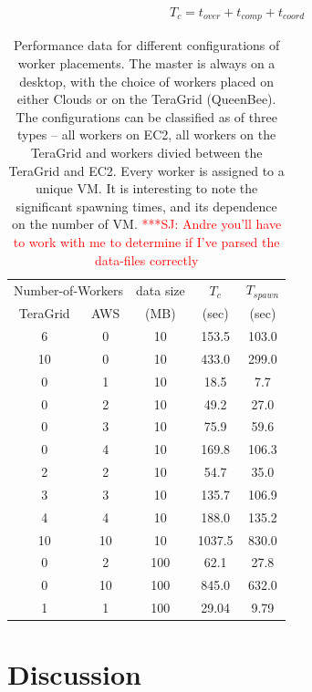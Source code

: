 \documentclass[conference,final]{IEEEtran}
\newcommand{\jhanote}[1]{ {\textcolor{red} { ***SJ: #1 }}}
\newcommand{\jhanote}[1]{}
\newcommand{\upp}{\vspace*{-0.5em}}
\begin{document}
\vspace{-1em}
\begin{eqnarray}
T_c = t_{over} + t_{comp} + t_{coord}
\end{eqnarray}


\begin{table}
\upp
\begin{tabular}{ccccc}
  \hline
  \multicolumn{2}{c}{Number-of-Workers}  &  data size   &  $T_c$  & $T_{spawn}$ \\   
  TeraGrid &  AWS &   (MB)  & (sec) & (sec)  \\
  \hline
  6 & 0 & 10   &  153.5 & 103.0  \\
  10 & 0 & 10  &  433.0  & 299.0 \\
  \hline 
  0 & 1 & 10 & 18.5 & 7.7 \\
  0 & 2 & 10 &  49.2 & 27.0 \\
  0 & 3 & 10 & 75.9 & 59.6 \\
  0 & 4 & 10 & 169.8 & 106.3 \\
  \hline 
  2 & 2 & 10 & 54.7 & 35.0 \\
  3 & 3 & 10 & 135.7 & 106.9 \\
  4 & 4 &10 & 188.0 & 135.2 \\
  10 & 10 & 10 & 1037.5 & 830.0 \\
  \hline
  \hline 
  0 & 2 & 100 & 62.1 & 27.8 \\
  0 & 10 & 100 &  845.0 & 632.0 \\
  1 & 1 & 100 & 29.04 & 9.79 \\
  \hline \hline
\end{tabular}
\upp
\caption{Performance data for different configurations of worker placements. The master is always on a desktop, with the choice of workers placed on either Clouds or on the TeraGrid (QueenBee). The configurations can be classified as of three types -- all workers on EC2, all workers on the TeraGrid and workers divied between the TeraGrid and EC2. Every worker is assigned to a unique  VM. It is interesting to note the significant spawning times, and its dependence on the number of VM. \jhanote{Andre you'll have to work with me to determine if I've parsed the data-files correctly}}
\label{stuff}
\upp
\upp
\end{table}

\section{Discussion}
\end{document}
